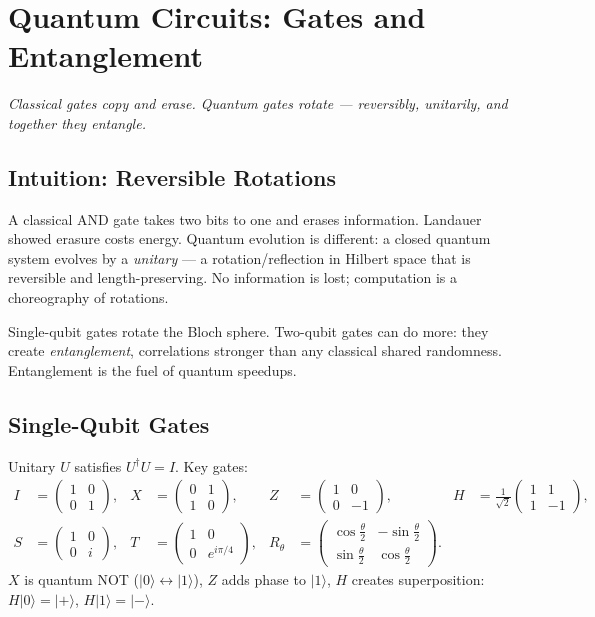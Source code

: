 \chapter{Quantum Circuits: Gates and Entanglement}\label{ch:circuits}
\begin{center}\small\textit{Classical gates copy and erase. Quantum gates rotate --- reversibly, unitarily, and together they entangle.}\end{center}

\section{Intuition: Reversible Rotations}
A classical AND gate takes two bits to one and erases information. Landauer showed erasure costs energy. Quantum evolution is different: a closed quantum system evolves by a \emph{unitary} --- a rotation/reflection in Hilbert space that is reversible and length-preserving. No information is lost; computation is a choreography of rotations.

Single-qubit gates rotate the Bloch sphere. Two-qubit gates can do more: they create \emph{entanglement}, correlations stronger than any classical shared randomness. Entanglement is the fuel of quantum speedups.

\section{Single-Qubit Gates}
Unitary $U$ satisfies $U^\dagger U=I$. Key gates:
\begin{align}
I&=\begin{pmatrix}1&0\\0&1\end{pmatrix}, &
X&=\begin{pmatrix}0&1\\1&0\end{pmatrix}, &
Z&=\begin{pmatrix}1&0\\0&-1\end{pmatrix}, &
H&=\tfrac1{\sqrt2}\begin{pmatrix}1&1\\1&-1\end{pmatrix},\\
S&=\begin{pmatrix}1&0\\0&i\end{pmatrix}, &
T&=\begin{pmatrix}1&0\\0&e^{i\pi/4}\end{pmatrix}, &
R_\theta&=\begin{pmatrix}\cos\tfrac\theta2&-\sin\tfrac\theta2\\\sin\tfrac\theta2&\cos\tfrac\theta2\end{pmatrix}.
\end{align}
$X$ is quantum NOT ($\lvert0\rangle\leftrightarrow\lvert1\rangle$), $Z$ adds phase to $\lvert1\rangle$, $H$ creates superposition: $H\lvert0\rangle=\lvert+\rangle$, $H\lvert1\rangle=\lvert-\rangle$.

